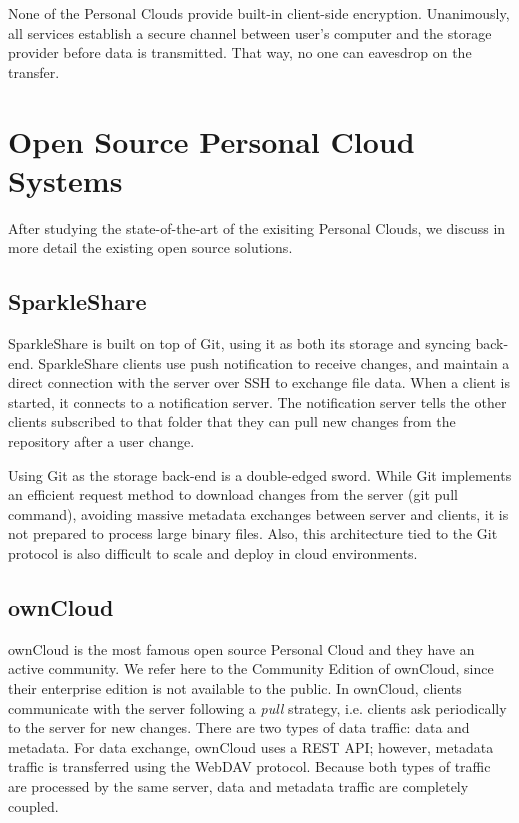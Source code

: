 None of the Personal Clouds provide built-in client-side encryption. Unanimously, all services establish a secure channel between user's computer and the storage provider before data is transmitted. That way, no one can eavesdrop on the transfer.

\section{Open Source Personal Cloud Systems}

After studying the state-of-the-art of the exisiting Personal Clouds, we discuss in more detail
the existing open source solutions.

\subsection{SparkleShare}

SparkleShare is built on top of Git, using it 
as both its storage and syncing back-end. SparkleShare clients use push notification
to receive changes, and maintain a direct connection with the server over SSH to exchange file data.
When a client is started, it connects to a notification server. The notification server tells the other
clients subscribed to that folder that they can pull new changes from the repository after a user
change. 

Using Git as the storage back-end is a double-edged sword. While Git implements an efficient request
method to download changes from the server (git pull command), avoiding massive metadata exchanges
between server and clients, it is not prepared to process large binary files. Also, this architecture
tied to the Git protocol is also difficult to scale and deploy in cloud environments.

\subsection{ownCloud}
ownCloud is the most famous open source  Personal Cloud 
and they have an active community. We refer here to the Community Edition of ownCloud, since their enterprise edition is not available to the public. In ownCloud, clients communicate with the server following a \textit{pull} strategy, i.e. clients ask periodically to the server for new changes. There are two types of data traffic: data and metadata. For data exchange, ownCloud uses a REST API; however, metadata traffic is transferred using the WebDAV protocol. 
Because both types of traffic are processed by the same server, data and metadata traffic are completely coupled.

